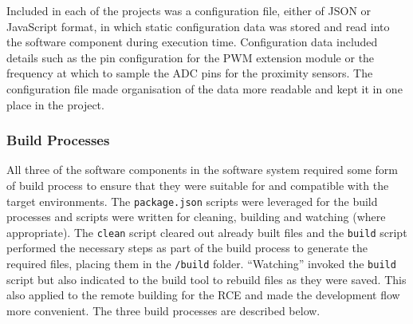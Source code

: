       Included in each of the projects was a configuration file, either of JSON or JavaScript format, in which static configuration data was stored and read into the software component during execution time. Configuration data included details such as the pin configuration for the PWM extension module or the frequency at which to sample the ADC pins for the proximity sensors. The configuration file made organisation of the data more readable and kept it in one place in the project.
    
    \subsubsection{Build Processes}
      All three of the software components in the software system required some form of build process to ensure that they were suitable for and compatible with the target environments. The \texttt{package.json} scripts were leveraged for the build processes and scripts were written for cleaning, building and watching (where appropriate). The \texttt{clean} script cleared out already built files and the \texttt{build} script performed the necessary steps as part of the build process to generate the required files, placing them in the \texttt{/build} folder. ``Watching'' invoked the \texttt{build} script but also indicated to the build tool to rebuild files as they were saved. This also applied to the remote building for the RCE and made the development flow more convenient. The three build processes are described below.
      
